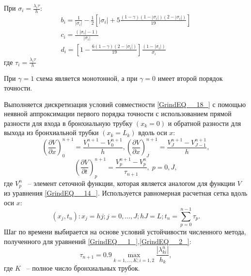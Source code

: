 При $\displaystyle \sigma _{i} =\frac{\lambda _{i} \tau }{h} $:
\begin{equation}
\begin{array}{l} \displaystyle {b_{i} =\frac{1}{\left|\sigma _{i} \right|} -\frac{1}{2} \left[\left|\sigma _{i} \right|+5\frac{\left(1-\gamma \right)\left(1-\left|\sigma _{i} \right|\right)\left(2-\left|\sigma _{i} \right|\right)}{19} \right]} \\ \displaystyle{ c_{i} = \frac{\left(\left|\sigma _{i} \right|-1\right)}{\left|\sigma _{i} \right|} } \\ \displaystyle{d_{i} =\left[1-\frac{6\left(1-\gamma \right)\left(2-\left|\sigma _{i} \right|\right)}{19} \right]\frac{\left(1-\left|\sigma _{i} \right|\right)}{\sigma _{i} } } \end{array}
\end{equation}
где $\displaystyle \tau_{i} = \frac{\lambda_{i} \tau}{h}$

При $\gamma =1$ схема является монотонной, а при $\gamma =0$ имеет второй порядок точности.

Выполняется дискретизация условий совместности \eqref{GrindEQ__18_} с помощью неявной аппроксимации первого порядка точности с использованием прямой разности для входа в бронхиальную трубку $\left(x_{k} =0\right)$ и обратной разности для выхода из бронхиальной трубки $\left(x_{k} =L_{k} \right)$ вдоль оси $x$:
\begin{equation} \label{GrindEQ__27_} 
\left(\frac{\partial V}{\partial x} \right)_{0}^{n+1} =\frac{V_{1}^{n+1} -V_{0}^{n+1} }{h} , \left(\frac{\partial V}{\partial x} \right)_{J}^{n+1} =\frac{V_{J}^{n+1} -V_{J-1}^{n+1} }{h} ,  
\end{equation} 
\begin{equation} \label{GrindEQ__28_} 
\left(\frac{\partial V}{\partial t} \right)_{p}^{n+1} =\frac{V_{p}^{n+1} -V_{p}^{n} }{\tau _{n+1} } ,\; p=0,J,  
\end{equation} 
где $V_{p}^{n} $ ~-- элемент сеточной функции, которая является аналогом для функции  $V$ из уравнения \eqref{GrindEQ__14_}. Используется равномерная расчетная сетка вдоль оси $x$:
\begin{equation} \label{GrindEQ__29_} 
\left(x_{j} ,t_{n} \right):x_{j} =hj;j=0,...,J;hJ=L;t_{n} =\sum _{p=0}^{n-1}\tau _{p}  .  
\end{equation} 
Шаг по времени выбирается на основе условий устойчивости численного метода, полученного для уравнений \eqref{GrindEQ__1_},\eqref{GrindEQ__2_}:
\begin{equation} \label{GrindEQ__30_} 
\tau _{n+1} =0.9\mathop{\max }\limits_{k=1,...,K;i=1,2} \frac{\left|\lambda _{ki}^{n} \right|}{h_{k} } ,  
\end{equation} 
где $K$ ~-- полное число бронхиальных трубок. 


